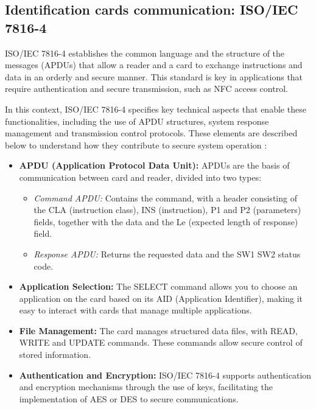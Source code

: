 \subsection{Identification cards communication: ISO/IEC 7816-4}

ISO/IEC 7816-4 \cite{Ref24} establishes the common language and the structure of the messages (APDUs) that allow a reader and a card to exchange instructions and data in an orderly and secure manner. This standard is key in applications that require authentication and secure transmission, such as NFC access control.

In this context, ISO/IEC 7816-4 specifies key technical aspects that enable these functionalities, including the use of APDU structures, system response management and transmission control protocols. These elements are described below to understand how they contribute to secure system operation \cite{Ref68}:

\begin{itemize}
	\item \textbf{APDU (Application Protocol Data Unit):} APDUs are the basis of communication between card and reader, divided into two types:
	\begin{itemize}
		\item \textit{Command APDU:} Contains the command, with a header consisting of the CLA (instruction class), INS (instruction), P1 and P2 (parameters) fields, together with the data and the Le (expected length of response) field.
		\item \textit{Response APDU:} Returns the requested data and the SW1 SW2 status code.
	\end{itemize}
	
	\item \textbf{Application Selection:} The SELECT command allows you to choose an application on the card based on its AID (Application Identifier), making it easy to interact with cards that manage multiple applications.
	
	\item \textbf{File Management:} The card manages structured data files, with READ, WRITE and UPDATE commands. These commands allow secure control of stored information.
	
	\item \textbf{Authentication and Encryption:} ISO/IEC 7816-4 supports authentication and encryption mechanisms through the use of keys, facilitating the implementation of AES or DES to secure communications.
\end{itemize}

